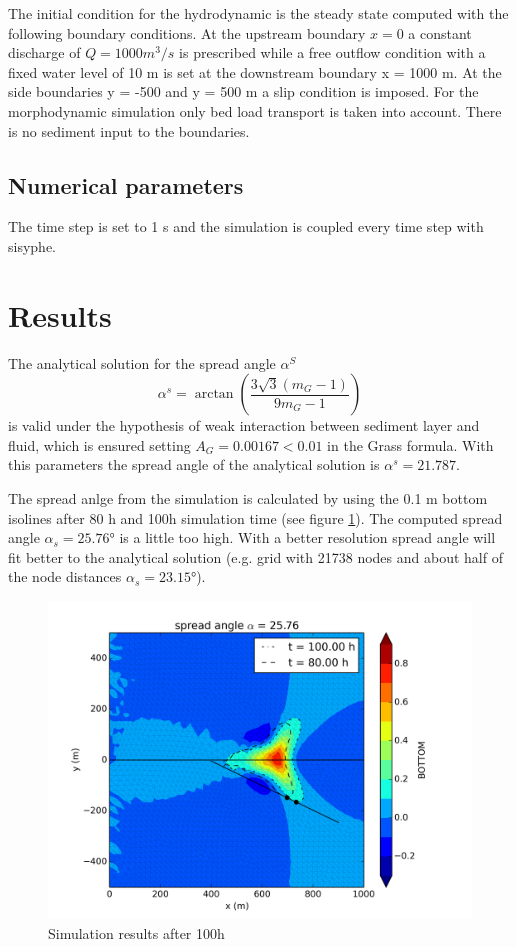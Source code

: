 The initial condition for the hydrodynamic is the steady state computed with the following boundary conditions.
At the upstream boundary $x = 0$ a constant discharge of $Q =
1000 m^3/s$ is prescribed while a free outflow condition with a fixed water level of 10 m 
is set at the downstream boundary
x = 1000 m. At the side boundaries y = -500 and y = 500 m  a
slip condition is imposed. 
For the morphodynamic simulation only bed load transport is taken into account. There is no sediment 
input to the boundaries.


%
\subsection{Numerical parameters}
%
The time step is set to 1 s and the simulation is coupled every time step with sisyphe.


%
\section{Results}
%
The analytical solution for the spread angle $\alpha^S$
\begin{equation}
\alpha^s = \arctan (\frac{3\sqrt{3}(m_G-1)}{9m_G-1})
\end{equation}
is valid under the hypothesis of weak interaction between sediment layer
and fluid, which is ensured setting $A_G=0.00167 < 0.01$ in the Grass formula. 
With this parameters the spread angle of the analytical solution is $\alpha^s=21.787$.

The spread anlge from the simulation is calculated by using the 
0.1 m  bottom isolines after 80 h and 100h simulation time (see figure \ref{sis_bump-t2d}).
The computed spread angle $\alpha_s=25.76°$ is a little too high. With a better resolution 
spread angle will fit better to the analytical solution 
(e.g. grid with 21738 nodes and about half of the node distances $\alpha_s=23.15°$). 


\begin{figure} [!ht]
\centering
\includegraphics[scale=0.6]{../img/sis_bump2d-t2d.png}
 \caption{Simulation results after 100h}\label{sis_bump-t2d}
\end{figure}


